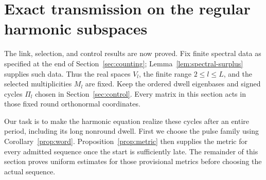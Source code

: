 \section{Exact transmission on the regular harmonic subspaces}
\label{sec:transmission}

The link, selection, and control results are now proved. Fix finite spectral
data as specified at the end of Section~\ref{sec:counting};
Lemma~\ref{lem:spectral-surplus} supplies such data. Thus the real spaces
\(V_l\), the finite range \(2\leq l\leq L\), and the selected
multiplicities \(M_l\) are fixed.
Keep the ordered dwell eigenbases and signed cycles \(\Pi_l\) chosen
in Section~\ref{sec:control}. Every matrix in this section acts in those
fixed round orthonormal coordinates.

Our task is to make the harmonic equation realize these cycles after
an entire period, including its long nonround dwell. First we choose the
pulse family using Corollary~\ref{prop:word}. Proposition~\ref{prop:metric}
then supplies the metric for every admitted sequence once the start is
sufficiently late. The remainder of this section proves uniform estimates
for those provisional metrics before choosing the actual sequence.

